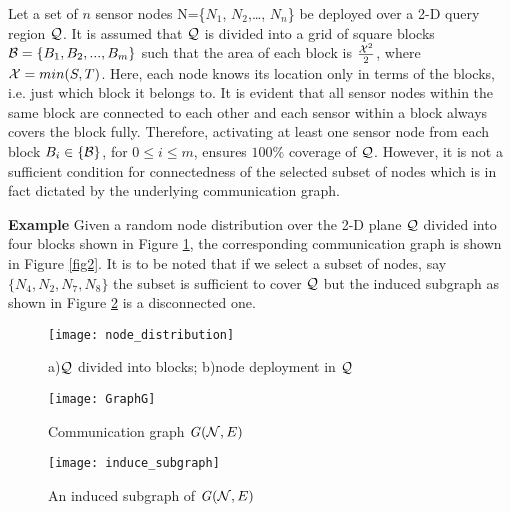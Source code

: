 \documentclass{acm_proc_article-sp}
\begin{document}
Let a set of $n$ sensor nodes {\cal N}={\{$N_1$, $N_2$,\ldots, $N_n$\}} be deployed over a 2-D query region $\cal Q$. It is assumed that $\cal Q$ is divided into a grid of square blocks $ { \cal B } = \{ B_1, B_2, ..., B_m \}$ such that the area of each block is $ \frac{{\cal X}^2}{2}$, where ${\cal X}= min( S, T)$. Here, each node knows its location only in terms of the blocks, i.e. just which block it belongs to. It is evident that all sensor nodes within the same block are connected to each other and each sensor within a block always covers the block fully. Therefore, activating at least one sensor node from each block $B_i \in \{ \cal B \}$, for $ 0 \leq i \le m$, ensures $100\%$ coverage of $\cal Q$. However, it is not a sufficient condition for connectedness of the selected subset of nodes which is in fact dictated by the underlying communication graph. 
 \vspace{-0.5cm}
\begin{paragraph}
 {\bf Example} Given a random node distribution over the 2-D plane ${\cal Q }$ divided into four blocks shown in Figure \ref{fig1}, the corresponding communication graph is shown in Figure \ref{fig2}. It is to be noted that if we select a subset of nodes, say $ \{N_4, N_2, N_7, N_8\}$ the subset is sufficient to cover ${\cal Q}$ but the induced subgraph as shown in Figure \ref{inducedgraph} is a disconnected one.\\
\end{paragraph}
\vspace{-0.5cm}
\begin{figure}[ht]
\centering
 \texttt{[image: node\_distribution]}
\caption{\scriptsize{a)${\cal Q}$ divided into blocks; b)node deployment in ${\cal Q}$}}
 \label{fig1}
 \vspace{-0.1cm}
\end{figure}
\begin{figure}[ht]
\hspace{0.6cm}
\begin{minipage}[b]{0.38\linewidth}
\centering
 \texttt{[image: GraphG]}
\caption{\scriptsize{Communication graph ${{\it G}}({\cal N}, E)$ }}
 \label{fig2}
\end{minipage}
\hspace{0.5cm}
\begin{minipage}[b]{0.38\linewidth}
\centering
 \texttt{[image: induce\_subgraph]}
\caption{\scriptsize{An induced subgraph of ${{\it G}}({\cal N}, E)$ }}
\label{inducedgraph}
\end{minipage}
\end{figure}
\end{document}
